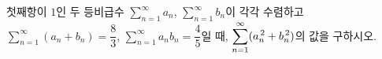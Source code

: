 첫째항이 $1$인 두 등비급수 $\displaystyle\sum_{n=1}^{\infty}a_n$, $\displaystyle\sum_{n=1}^{\infty}b_n$이 각각 수렴하고 $\displaystyle\sum_{n=1}^{\infty}(a_n+b_n)=\dfrac{8}{3}$, $\displaystyle\sum_{n=1}^{\infty}a_nb_n=\dfrac{4}{5}$일 때, $\displaystyle\sum_{n=1}^{\infty}(a_n^{\mkern3mu 2}+b_n^{\mkern3mu 2})$의 값을 구하시오.
